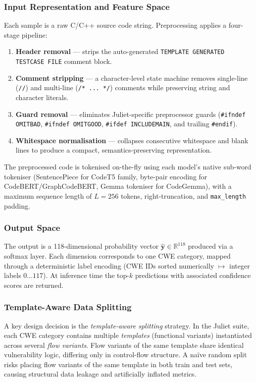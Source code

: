 \subsubsection{Input Representation and Feature Space}
Each sample is a raw C/C++ source code string.  Preprocessing applies a
four-stage pipeline:
\begin{enumerate}
    \item \textbf{Header removal} --- strips the auto-generated
          \texttt{TEMPLATE GENERATED TESTCASE FILE} comment block.
    \item \textbf{Comment stripping} --- a character-level state machine
          removes single-line (\texttt{//}) and multi-line
          (\texttt{/* ... */}) comments while preserving string and
          character literals.
    \item \textbf{Guard removal} --- eliminates Juliet-specific preprocessor
          guards (\texttt{\#ifndef OMITBAD}, \texttt{\#ifndef OMITGOOD},
          \texttt{\#ifdef INCLUDEMAIN}, and trailing \texttt{\#endif}).
    \item \textbf{Whitespace normalisation} --- collapses consecutive
          whitespace and blank lines to produce a compact, semantics-preserving
          representation.
\end{enumerate}
The preprocessed code is tokenised on-the-fly using each model's native
sub-word tokeniser (SentencePiece for CodeT5 family, byte-pair encoding for
CodeBERT/GraphCodeBERT, Gemma tokeniser for CodeGemma), with a maximum
sequence length of $L = 256$ tokens, right-truncation, and
\texttt{max\_length} padding.

\subsubsection{Output Space}
The output is a 118-dimensional probability vector $\hat{\mathbf{y}} \in
\mathbb{R}^{118}$ produced via a softmax layer.  Each dimension corresponds
to one CWE category, mapped through a deterministic label encoding (CWE IDs
sorted numerically $\mapsto$ integer labels $0 \ldots 117$).  At inference
time the top-$k$ predictions with associated confidence scores are returned.

\subsubsection{Template-Aware Data Splitting}
A key design decision is the \emph{template-aware splitting} strategy.  In
the Juliet suite, each CWE category contains multiple \emph{templates}
(functional variants) instantiated across several \emph{flow variants}.
Flow variants of the same template share identical vulnerability logic,
differing only in control-flow structure.  A na\"ive random split risks
placing flow variants of the same template in both train and test sets,
causing structural data leakage and artificially inflated metrics.

